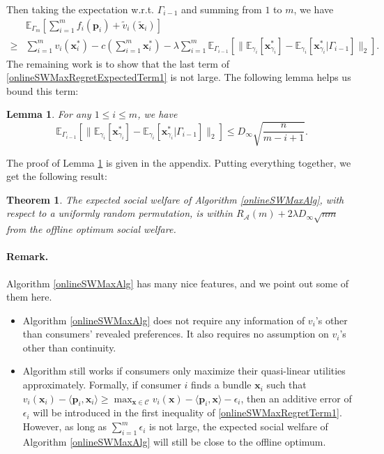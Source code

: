 \documentclass{article}
\newtheorem{theorem}{Theorem}[section]
\newtheorem{lemma}{Lemma}[section]
\begin{document}
Then taking the expectation w.r.t. $\Gamma_{i-1}$ and summing from $1$ to $m$, we have
\begin{equation}\label{onlineSWMaxRegretExpectedTerm1}
    \begin{array}{rl}
         & \mathbb{E}_{\Gamma_m}[\sum_{i=1}^{m}f_i(\mathbf{p}_i)+\tilde{v}_i(\tilde{\mathbf{x}}_i)] \\
        \ge & \sum_{i=1}^{m}v_i(\mathbf{x}_i^*)-c(\sum_{i=1}^{m}\mathbf{x}_i^*)-\lambda \sum_{i=1}^{m}\mathbb{E}_{\Gamma_{i-1}}\left[\|\mathbb{E}_{\gamma_i}[\mathbf{x}_{\gamma_i}^*]-\mathbb{E}_{\gamma_i}[\mathbf{x}_{\gamma_i}^*|\Gamma_{i-1}]\|_2\right].
    \end{array}
\end{equation}
The remaining work is to show that the last term of \eqref{onlineSWMaxRegretExpectedTerm1} is not large. The following lemma helps us bound this term:
\begin{lemma}\label{offlineOptError}
    For any $1\le i\le m$, we have
    \begin{equation}
        \mathbb{E}_{\Gamma_{i-1}}\left[\|\mathbb{E}_{\gamma_i}[\mathbf{x}_{\gamma_i}^*]-\mathbb{E}_{\gamma_i}[\mathbf{x}_{\gamma_i}^*|\Gamma_{i-1}]\|_2\right]\le D_{\infty}\sqrt{\frac{n}{m-i+1}}.
    \end{equation}
\end{lemma}
The proof of Lemma \ref{offlineOptError} is given in the appendix.
Putting everything together, we get the following result:
\begin{theorem}\label{onlineSWMaxMain}
    The expected social welfare of Algorithm \ref{onlineSWMaxAlg}, with respect to a uniformly random permutation, is within $R_{\mathcal{A}}(m)+2\lambda D_{\infty}\sqrt{nm}$ from the offline optimum social welfare.
\end{theorem}

\paragraph{Remark.}
Algorithm \ref{onlineSWMaxAlg} has many nice features, and we point out some of them here.
\begin{itemize}
    \item Algorithm \ref{onlineSWMaxAlg} does not require any information of $v_i$'s other than consumers' revealed preferences. It also requires no assumption on $v_i$'s other than continuity.
    \item Algorithm still works if consumers only maximize their quasi-linear utilities approximately. Formally, if consumer $i$ finds a bundle $\mathbf{x}_i$ such that $v_i(\mathbf{x}_i)-\langle \mathbf{p}_i,\mathbf{x}_i\rangle\ge\max_{\mathbf{x}\in \mathcal{C}}v_i(\mathbf{x})-\langle \mathbf{p}_i,\mathbf{x}\rangle-\epsilon_i$, then an additive error of $\epsilon_i$ will be introduced in the first inequality of \eqref{onlineSWMaxRegretTerm1}. However, as long as $\sum_{i=1}^{m}\epsilon_i$ is not large, the expected social welfare of Algorithm \ref{onlineSWMaxAlg} will still be close to the offline optimum.
\end{itemize}
\end{document}

